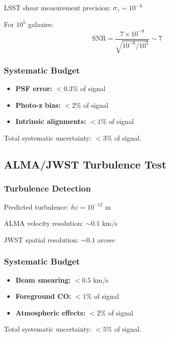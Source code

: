 \documentclass[11pt]{article}
\begin{document}
LSST shear measurement precision: $\sigma_\gamma \sim 10^{-3}$

For $10^5$ galaxies:
\begin{equation}
\text{SNR} = \frac{7 \times 10^{-9}}{\sqrt{10^{-6}/10^5}} \sim 7
\end{equation}

\subsubsection{Systematic Budget}
\begin{itemize}
\item \textbf{PSF error:} $< 0.3\%$ of signal
\item \textbf{Photo-z bias:} $< 2\%$ of signal
\item \textbf{Intrinsic alignments:} $< 1\%$ of signal
\end{itemize}

Total systematic uncertainty: $< 3\%$ of signal.

\subsection{ALMA/JWST Turbulence Test}

\subsubsection{Turbulence Detection}
Predicted turbulence: $\delta\psi = 10^{-12}$ m

ALMA velocity resolution: $\sim 0.1$ km/s

JWST spatial resolution: $\sim 0.1$ arcsec

\subsubsection{Systematic Budget}
\begin{itemize}
\item \textbf{Beam smearing:} $< 0.5$ km/s
\item \textbf{Foreground CO:} $< 1\%$ of signal
\item \textbf{Atmospheric effects:} $< 2\%$ of signal
\end{itemize}

Total systematic uncertainty: $< 5\%$ of signal.

\end{document}
